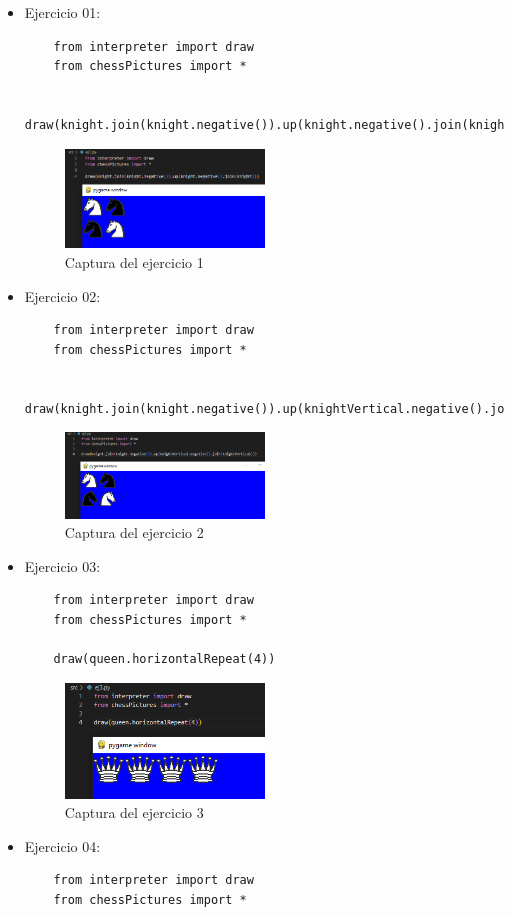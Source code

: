 \documentclass{article}
\begin{document}
	\begin{itemize}
		\item Ejercicio 01:
		\begin{lstlisting}
	from interpreter import draw
	from chessPictures import *
			
	draw(knight.join(knight.negative()).up(knight.negative().join(knight)))
		\end{lstlisting}
		\begin{figure}[h]
			\centering
			\includegraphics[width=0.5\textwidth]{Imagenes/4e1.png}
			\caption{Captura del ejercicio 1}
		\end{figure}
		\item Ejercicio 02:
		\begin{lstlisting}
	from interpreter import draw
	from chessPictures import *
			
	draw(knight.join(knight.negative()).up(knightVertical.negative().join(knightVertical)))
		\end{lstlisting}
		\begin{figure}[h]
			\centering
			\includegraphics[width=0.5\textwidth]{Imagenes/4e2.png}
			\caption{Captura del ejercicio 2}
		\end{figure}
		\item Ejercicio 03:
		\begin{lstlisting}
	from interpreter import draw
	from chessPictures import *
			
	draw(queen.horizontalRepeat(4))
		\end{lstlisting}
		\begin{figure}[h]
			\centering
			\includegraphics[width=0.5\textwidth]{Imagenes/4e3.png}
			\caption{Captura del ejercicio 3}
		\end{figure}
		\item Ejercicio 04:
		\begin{lstlisting}
	from interpreter import draw
	from chessPictures import *
			

\end{lstlisting}
\end{itemize}
\end{document}
